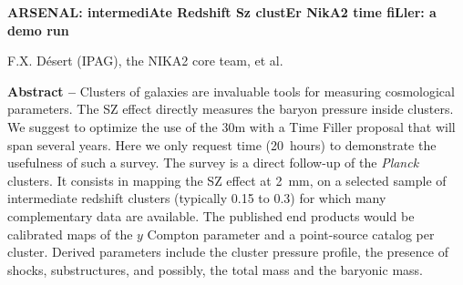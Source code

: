\documentclass[10pt,a4paper,twoside,graphicx,color]{article}
\begin{document}
%
%
\begin{center}{\huge \bf
ARSENAL: intermediAte Redshift Sz clustEr NikA2 time fiLler: a demo run
}\end{center}
% 
\begin{center}
F.X. D\'esert (IPAG), the NIKA2 core team, et al.
\end{center}

\vspace{-0.3cm}
       {\bf Abstract -- } Clusters of galaxies are invaluable tools
       for measuring cosmological parameters. The SZ effect directly
       measures the baryon pressure inside clusters. We suggest to
       optimize the use of the 30m with a Time Filler proposal that
       will span several years. Here we only request time (20~hours)
       to demonstrate the usefulness of such a survey. The survey is a
       direct follow-up of the {\sl Planck} clusters. It consists in
       mapping the SZ effect at 2~mm, on a selected sample of
       intermediate redshift clusters (typically 0.15 to 0.3) for
       which many complementary data are available. The published end
       products would be calibrated maps of the $y$ Compton parameter
       and a point-source catalog per cluster. Derived parameters
       include the cluster pressure profile, the presence of shocks,
       substructures, and possibly, the total mass and the baryonic
       mass.\\

\end{document}
